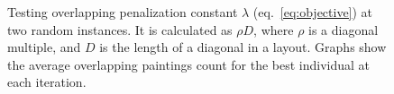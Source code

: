 \begin{figure}[h!]
    \centering

    \caption[Testing overlapping penalization constant]
    {Testing overlapping penalization constant $\lambda$ (eq.~\ref{eq:objective}) at two random instances.
    It is calculated as $\rho D$, where $\rho$ is a diagonal multiple, and $D$ is the length of a diagonal in a layout.
    Graphs show the average overlapping paintings count for the best individual at each iteration.}
    \label{fig:hyperparameters-overlapping-penalization-constant}%
\end{figure}


